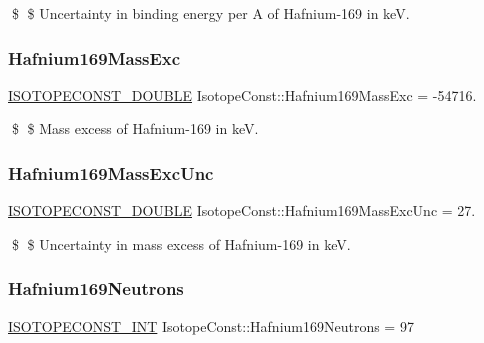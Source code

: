 \$ \$ Uncertainty in binding energy per A of Hafnium-\/169 in keV. \mbox{\label{group___isotope_const-_hafnium-_hf169_ga68866d23ca452f1222ebeec708ae1130}} 
\subsubsection{\texorpdfstring{Hafnium169\+Mass\+Exc}{Hafnium169MassExc}}
{\footnotesize\ttfamily \mbox{\hyperlink{group___isotope_const-_macros_ga8f45a7272ce02c0b4c65c44636ed719a}{I\+S\+O\+T\+O\+P\+E\+C\+O\+N\+S\+T\+\_\+\+D\+O\+U\+B\+LE}} Isotope\+Const\+::\+Hafnium169\+Mass\+Exc = -\/54716.}

\$ \$ Mass excess of Hafnium-\/169 in keV. \mbox{\label{group___isotope_const-_hafnium-_hf169_gae74634cb35780cb9c6fd60bf5b322189}} 
\subsubsection{\texorpdfstring{Hafnium169\+Mass\+Exc\+Unc}{Hafnium169MassExcUnc}}
{\footnotesize\ttfamily \mbox{\hyperlink{group___isotope_const-_macros_ga8f45a7272ce02c0b4c65c44636ed719a}{I\+S\+O\+T\+O\+P\+E\+C\+O\+N\+S\+T\+\_\+\+D\+O\+U\+B\+LE}} Isotope\+Const\+::\+Hafnium169\+Mass\+Exc\+Unc = 27.}

\$ \$ Uncertainty in mass excess of Hafnium-\/169 in keV. \mbox{\label{group___isotope_const-_hafnium-_hf169_gae3d5f156bb205bbc30479764726c9a90}} 
\subsubsection{\texorpdfstring{Hafnium169\+Neutrons}{Hafnium169Neutrons}}
{\footnotesize\ttfamily \mbox{\hyperlink{group___isotope_const-_macros_ga5f18360b3e99483a35c32d789e62621c}{I\+S\+O\+T\+O\+P\+E\+C\+O\+N\+S\+T\+\_\+\+I\+NT}} Isotope\+Const\+::\+Hafnium169\+Neutrons = 97}

